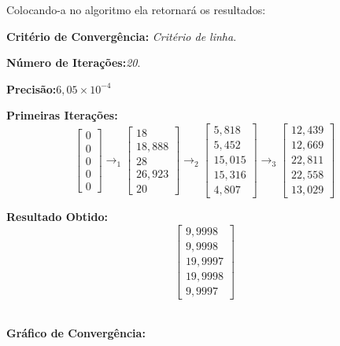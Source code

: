 \documentclass[
	12pt,				%
	openright,			%
	twoside,			%
	a4paper,			%
	english,			%
	french,				%
	spanish,			%
	brazil				%
	]{abntex2_new}
\begin{document}
Colocando-a no algoritmo ela retornará os resultados:

\begin{alineas}
	\item{\textbf{Critério de Convergência:} \textit{Critério de linha}.}
	\item{\textbf{Número de Iterações:}\textit{20}.}
	\item{\textbf{Precisão:}\textit{$6,05 \times 10^{-4}$}}
	\item{\textbf{Primeiras Iterações:}\\
		$$	\begin{bmatrix}
		0\\
		0\\
		0\\
		0\\
		0
		\end{bmatrix} \rightarrow_1
		\begin{bmatrix}
		18\\
		18,888\\
		28\\
		26,923\\
		20
		\end{bmatrix} \rightarrow_2
		\begin{bmatrix}
		5,818\\
		5,452\\
		15,015\\
		15,316\\
		4,807
		\end{bmatrix} \rightarrow_3
		\begin{bmatrix}
		12,439\\
		12,669\\
		22,811\\
		22,558\\
		13,029
		\end{bmatrix}$$
	}
	\item{\textbf{Resultado Obtido:}}\\
	$$\begin{bmatrix}
	9,9998\\
	9,9998\\
	19,9997\\
	19,9998\\
	9,9997
	\end{bmatrix}$$\\

	\item{\textbf{Gráfico de Convergência:}}
	

\end{alineas}
\end{document}
